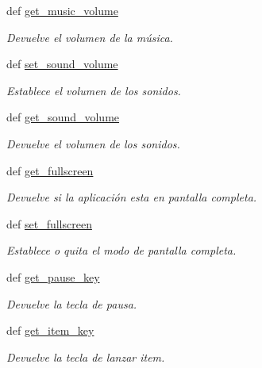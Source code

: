 \begin{DoxyCompactItemize}
def \hyperlink{classengine_1_1config_1_1Config_a7af64be9f27007b2b3a13c39b410ef4c}{get\-\_\-music\-\_\-volume}
\begin{DoxyCompactList}\small\item\em \-Devuelve el volumen de la música. \end{DoxyCompactList}\item 
def \hyperlink{classengine_1_1config_1_1Config_a5d48279b40a5635032ecd4649e9542ce}{set\-\_\-sound\-\_\-volume}
\begin{DoxyCompactList}\small\item\em \-Establece el volumen de los sonidos. \end{DoxyCompactList}\item 
def \hyperlink{classengine_1_1config_1_1Config_ab03c0fdab177b068913123c18dad4f7a}{get\-\_\-sound\-\_\-volume}
\begin{DoxyCompactList}\small\item\em \-Devuelve el volumen de los sonidos. \end{DoxyCompactList}\item 
def \hyperlink{classengine_1_1config_1_1Config_ab569c0784c9dcc5b88f4a181c4da3d4d}{get\-\_\-fullscreen}
\begin{DoxyCompactList}\small\item\em \-Devuelve si la aplicación esta en pantalla completa. \end{DoxyCompactList}\item 
def \hyperlink{classengine_1_1config_1_1Config_af4544c8e37988407141e88b6dcff8ef6}{set\-\_\-fullscreen}
\begin{DoxyCompactList}\small\item\em \-Establece o quita el modo de pantalla completa. \end{DoxyCompactList}\item 
def \hyperlink{classengine_1_1config_1_1Config_aeaf13340c1fef68d92baa2e67d17338e}{get\-\_\-pause\-\_\-key}
\begin{DoxyCompactList}\small\item\em \-Devuelve la tecla de pausa. \end{DoxyCompactList}\item 
def \hyperlink{classengine_1_1config_1_1Config_a812bf8311696b6757c18f569f2f2d647}{get\-\_\-item\-\_\-key}
\begin{DoxyCompactList}\small\item\em \-Devuelve la tecla de lanzar item. \end{DoxyCompactList}\item 

\end{DoxyCompactItemize}
